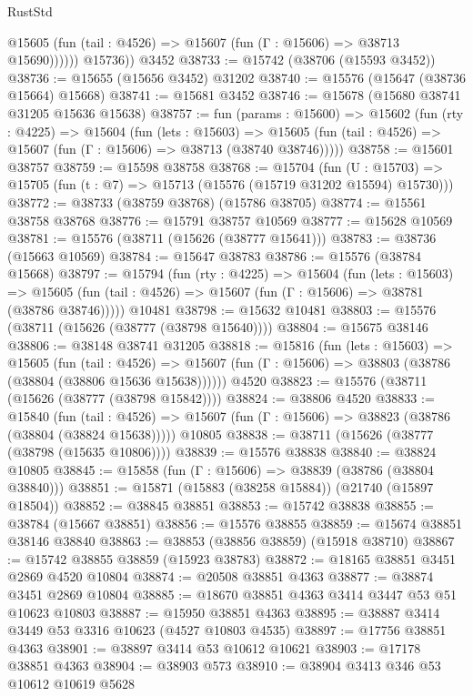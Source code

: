 \begin{lexlean}{RustStd}
\begin{coremodule}
              @15605 (fun (tail : @4526) => @15607 (fun (Γ : @15606) => @38713 @15690))))))
        @15736))
    @3452
@38733 := @15742 (@38706 (@15593 @3452))
@38736 := @15655 (@15656 @3452) @31202
@38740 := @15576 (@15647 (@38736 @15664) @15668)
@38741 := @15681 @3452
@38746 := @15678 (@15680 @38741 @31205 @15636 @15638)
@38757 := fun (params : @15600) =>
  @15602
    (fun (rty : @4225) =>
    @15604
      (fun (lets : @15603) =>
      @15605 (fun (tail : @4526) => @15607 (fun (Γ : @15606) => @38713 (@38740 @38746)))))
@38758 := @15601 @38757
@38759 := @15598 @38758
@38768 := @15704
    (fun (U : @15703) => @15705 (fun (t : @7) => @15713 (@15576 (@15719 @31202 @15594) @15730)))
@38772 := @38733 (@38759 @38768) (@15786 @38705)
@38774 := @15561 @38758 @38768
@38776 := @15791 @38757 @10569
@38777 := @15628 @10569
@38781 := @15576 (@38711 (@15626 (@38777 @15641)))
@38783 := @38736 (@15663 @10569)
@38784 := @15647 @38783
@38786 := @15576 (@38784 @15668)
@38797 := @15794
    (fun (rty : @4225) =>
    @15604
      (fun (lets : @15603) =>
      @15605 (fun (tail : @4526) => @15607 (fun (Γ : @15606) => @38781 (@38786 @38746)))))
    @10481
@38798 := @15632 @10481
@38803 := @15576 (@38711 (@15626 (@38777 (@38798 @15640))))
@38804 := @15675 @38146
@38806 := @38148 @38741 @31205
@38818 := @15816
    (fun (lets : @15603) =>
    @15605
      (fun (tail : @4526) =>
      @15607 (fun (Γ : @15606) => @38803 (@38786 (@38804 (@38806 @15636 @15638))))))
    @4520
@38823 := @15576 (@38711 (@15626 (@38777 (@38798 @15842))))
@38824 := @38806 @4520
@38833 := @15840
    (fun (tail : @4526) => @15607 (fun (Γ : @15606) => @38823 (@38786 (@38804 (@38824 @15638)))))
    @10805
@38838 := @38711 (@15626 (@38777 (@38798 (@15635 @10806))))
@38839 := @15576 @38838
@38840 := @38824 @10805
@38845 := @15858 (fun (Γ : @15606) => @38839 (@38786 (@38804 @38840)))
@38851 := @15871 (@15883 (@38258 @15884)) (@21740 (@15897 @18504))
@38852 := @38845 @38851
@38853 := @15742 @38838
@38855 := @38784 (@15667 @38851)
@38856 := @15576 @38855
@38859 := @15674 @38851 @38146 @38840
@38863 := @38853 (@38856 @38859) (@15918 @38710)
@38867 := @15742 @38855 @38859 (@15923 @38783)
@38872 := @18165 @38851 @3451 @2869 @4520 @10804
@38874 := @20508 @38851 @4363
@38877 := @38874 @3451 @2869 @10804
@38885 := @18670 @38851 @4363 @3414 @3447 @53 @51 @10623 @10803
@38887 := @15950 @38851 @4363
@38895 := @38887 @3414 @3449 @53 @3316 @10623 (@4527 @10803 @4535)
@38897 := @17756 @38851 @4363
@38901 := @38897 @3414 @53 @10612 @10621
@38903 := @17178 @38851 @4363
@38904 := @38903 @573
@38910 := @38904 @3413 @346 @53 @10612 @10619 @5628

\end{coremodule}
\end{lexlean}
